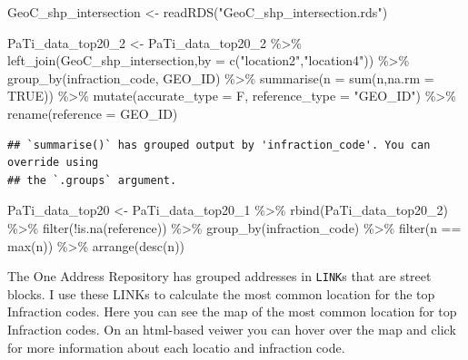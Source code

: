 \documentclass[
]{article}
\newenvironment{Shaded}{\begin{snugshade}}{\end{snugshade}}
\newcommand{\AttributeTok}[1]{\textcolor[rgb]{0.77,0.63,0.00}{#1}}
\newcommand{\ConstantTok}[1]{\textcolor[rgb]{0.00,0.00,0.00}{#1}}
\newcommand{\FunctionTok}[1]{\textcolor[rgb]{0.00,0.00,0.00}{#1}}
\newcommand{\NormalTok}[1]{#1}
\newcommand{\OtherTok}[1]{\textcolor[rgb]{0.56,0.35,0.01}{#1}}
\newcommand{\SpecialCharTok}[1]{\textcolor[rgb]{0.00,0.00,0.00}{#1}}
\newcommand{\StringTok}[1]{\textcolor[rgb]{0.31,0.60,0.02}{#1}}
\begin{document}
\begin{Shaded}
\begin{Highlighting}[]
\NormalTok{GeoC\_shp\_intersection }\OtherTok{\textless{}{-}} \FunctionTok{readRDS}\NormalTok{(}\StringTok{"GeoC\_shp\_intersection.rds"}\NormalTok{)}


\NormalTok{PaTi\_data\_top20\_2 }\OtherTok{\textless{}{-}}\NormalTok{ PaTi\_data\_top20\_2 }\SpecialCharTok{\%\textgreater{}\%} \FunctionTok{left\_join}\NormalTok{(GeoC\_shp\_intersection,}\AttributeTok{by =} \FunctionTok{c}\NormalTok{(}\StringTok{"location2"}\NormalTok{,}\StringTok{"location4"}\NormalTok{)) }\SpecialCharTok{\%\textgreater{}\%} 
  \FunctionTok{group\_by}\NormalTok{(infraction\_code, GEO\_ID) }\SpecialCharTok{\%\textgreater{}\%}
  \FunctionTok{summarise}\NormalTok{(}\AttributeTok{n =} \FunctionTok{sum}\NormalTok{(n,}\AttributeTok{na.rm =} \ConstantTok{TRUE}\NormalTok{)) }\SpecialCharTok{\%\textgreater{}\%} 
  \FunctionTok{mutate}\NormalTok{(}\AttributeTok{accurate\_type =}\NormalTok{ F,}
         \AttributeTok{reference\_type =} \StringTok{"GEO\_ID"}\NormalTok{) }\SpecialCharTok{\%\textgreater{}\%} 
  \FunctionTok{rename}\NormalTok{(}\AttributeTok{reference =}\NormalTok{ GEO\_ID)}
\end{Highlighting}
\end{Shaded}

\begin{verbatim}
## `summarise()` has grouped output by 'infraction_code'. You can override using
## the `.groups` argument.
\end{verbatim}

\begin{Shaded}
\begin{Highlighting}[]
\NormalTok{PaTi\_data\_top20 }\OtherTok{\textless{}{-}}\NormalTok{ PaTi\_data\_top20\_1 }\SpecialCharTok{\%\textgreater{}\%}
  \FunctionTok{rbind}\NormalTok{(PaTi\_data\_top20\_2) }\SpecialCharTok{\%\textgreater{}\%} 
  \FunctionTok{filter}\NormalTok{(}\SpecialCharTok{!}\FunctionTok{is.na}\NormalTok{(reference)) }\SpecialCharTok{\%\textgreater{}\%} 
  \FunctionTok{group\_by}\NormalTok{(infraction\_code) }\SpecialCharTok{\%\textgreater{}\%}
  \FunctionTok{filter}\NormalTok{(n }\SpecialCharTok{==} \FunctionTok{max}\NormalTok{(n)) }\SpecialCharTok{\%\textgreater{}\%} 
  \FunctionTok{arrange}\NormalTok{(}\FunctionTok{desc}\NormalTok{(n))}
\end{Highlighting}
\end{Shaded}

The One Address Repository has grouped addresses in \texttt{LINK}s that
are street blocks. I use these LINKs to calculate the most common
location for the top Infraction codes. Here you can see the map of the
most common location for top Infraction codes. On an html-based veiwer
you can hover over the map and click for more information about each
locatio and infraction code.
\end{document}

